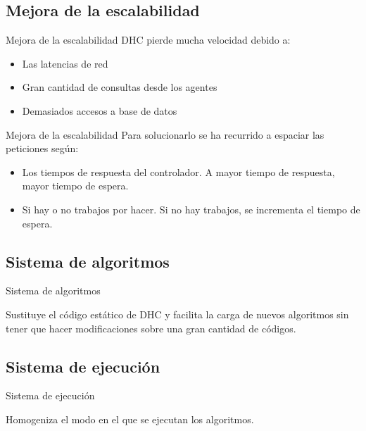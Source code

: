 \documentclass[12pt]{beamer}
\begin{document}
\subsection{Mejora de la escalabilidad}
\begin{frame}{Mejora de la escalabilidad}
	DHC pierde mucha velocidad debido a:
	\pause
	\begin{itemize}
		\item Las latencias de red
		\item Gran cantidad de consultas desde los agentes
		\item Demasiados accesos a base de datos
	\end{itemize}
\end{frame}

\begin{frame}{Mejora de la escalabilidad}
	Para solucionarlo se ha recurrido a espaciar las peticiones según:
	\pause
	\begin{itemize}
		\item Los tiempos de respuesta del controlador. A mayor tiempo de respuesta, mayor tiempo de espera.
		\item Si hay o no trabajos por hacer. Si no hay trabajos, se incrementa el tiempo de espera.
	\end{itemize}
\end{frame}



\subsection{Sistema de algoritmos}
\begin{frame}{Sistema de algoritmos}
	\begin{center}
		Sustituye el código estático de DHC y facilita la carga de nuevos algoritmos sin tener que hacer modificaciones sobre una gran cantidad de códigos.
	\end{center}
\end{frame}

\subsection{Sistema de ejecución}
\begin{frame}{Sistema de ejecución}
	\begin{center}
		Homogeniza el modo en el que se ejecutan los algoritmos.
	\end{center}
\end{frame}
\end{document}
